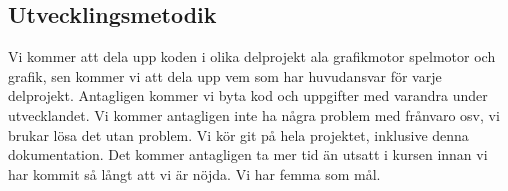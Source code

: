 \documentclass[a4paper,8pt]{article}
\begin{document}
\subsection{Utvecklingsmetodik}
Vi kommer att dela upp koden i olika delprojekt ala grafikmotor spelmotor och
grafik, sen kommer vi att dela upp vem som har huvudansvar för varje delprojekt.
Antagligen kommer vi byta kod och uppgifter med varandra under utvecklandet. Vi
kommer antagligen inte ha några problem med frånvaro osv, vi brukar lösa det 
utan problem. Vi kör git på hela projektet, inklusive denna dokumentation. Det
kommer antagligen ta mer tid än utsatt i kursen innan vi har kommit så långt 
att vi är nöjda. Vi har femma som mål.


\end{document}
